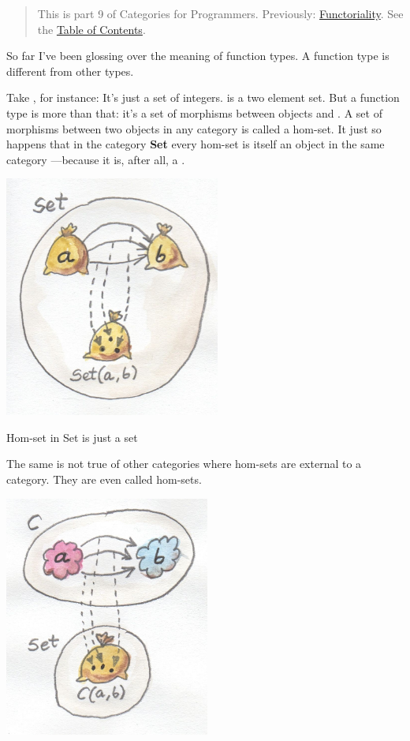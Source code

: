 \begin{quote}
This is part 9 of Categories for Programmers. Previously:
\href{https://bartoszmilewski.com/2015/02/03/functoriality/}{Functoriality}.
See the
\href{https://bartoszmilewski.com/2014/10/28/category-theory-for-programmers-the-preface/}{Table
of Contents}.
\end{quote}

So far I've been glossing over the meaning of function types. A function
type is different from other types.

Take , for instance: It's just a set of integers.
 is a two element set. But a function type
 is more than that: it's a set of morphisms
between objects  and . A set of morphisms between
two objects in any category is called a hom-set. It just so happens that
in the category \textbf{Set} every hom-set is itself an object in the
same category ---because it is, after all, a .

\hypertarget{attachment_4241}{}
\includegraphics[width=2.79167in]{images/set-hom-set.jpg}

Hom-set in Set is just a set

The same is not true of other categories where hom-sets are external to
a category. They are even called  hom-sets.

\hypertarget{attachment_4242}{}
\includegraphics[width=2.65625in]{images/hom-set.jpg}

